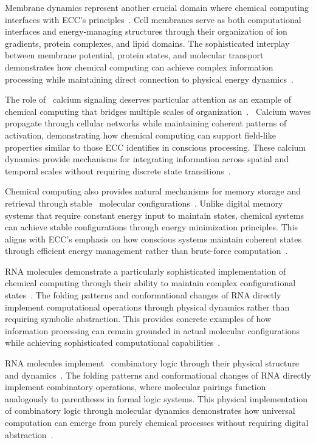  Membrane dynamics represent another crucial domain where chemical computing interfaces with ECC's principles~\cite{Magnasco1997,anastassiou2015ephaptic}. Cell membranes serve as both computational interfaces and energy-managing structures through their organization of ion gradients, protein complexes, and lipid domains. The sophisticated interplay between membrane potential, protein states, and molecular transport demonstrates how chemical computing can achieve complex information processing while maintaining direct connection to physical energy dynamics~\cite{ruffini2020realistic}.

The role of~ calcium signaling deserves particular attention as an example of chemical computing that bridges multiple scales of organization~\cite{Prakash2007,pinotsis2023cytoelectric}.~ Calcium waves propagate through cellular networks while maintaining coherent patterns of activation, demonstrating how chemical computing can support field-like properties similar to those ECC identifies in conscious processing. These calcium dynamics provide mechanisms for integrating information across spatial and temporal scales without requiring discrete state transitions~\cite{freeman2006nonlinear,lee2024cell}.

Chemical computing also provides natural mechanisms for memory storage and retrieval through stable~ molecular configurations~\cite{Qian2011,gershman2023molecular}. Unlike digital memory systems that require constant energy input to maintain states, chemical systems can achieve stable configurations through energy minimization principles. This aligns with ECC's emphasis on how conscious systems maintain coherent states through efficient energy management rather than brute-force computation~\cite{Soloveichik2010}.

 RNA molecules demonstrate a particularly sophisticated implementation of chemical computing through their ability to maintain complex configurational states~\cite{Wang2021,akhlaghpour2022rna}. The folding patterns and conformational changes of RNA directly implement computational operations through physical dynamics rather than requiring symbolic abstraction. This provides concrete examples of how information processing can remain grounded in actual molecular configurations while achieving sophisticated computational capabilities~\cite{Bicknell2021,Lyon2021}.

RNA molecules implement~ combinatory logic through their physical structure and dynamics~\cite{Adamatzky2021}. The folding patterns and conformational changes of RNA directly implement combinatory operations, where molecular pairings function analogously to parentheses in formal logic systems. This physical implementation of combinatory logic through molecular dynamics demonstrates how universal computation can emerge from purely chemical processes without requiring digital abstraction~\cite{Hjelmfelt1991,TranVanMinh2015}.

